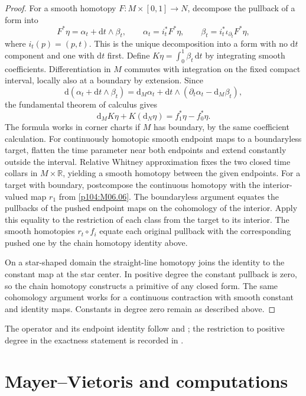 \documentclass[11pt,oneside,openany]{book}
\theoremstyle{definition}
\theoremstyle{remark}
\newcommand{\R}{\mathbb R}
\newcommand{\dd}{\mathrm d}
\begin{document}
\begin{proof}
For a smooth homotopy \(F:M\times[0,1]\to N\), decompose the
pullback of a form into
\[
 F^*\eta=\alpha_t+\dd t\wedge\beta_t,\qquad
 \alpha_t=i_t^*F^*\eta,\qquad
 \beta_t=i_t^*\iota_{\partial_t}F^*\eta ,
\]
where \(i_t(p)=(p,t)\). This is the unique decomposition into
a form with no \(\dd t\) component and one with \(\dd t\) first.
Define \(K\eta=\int_0^1\beta_t\,\dd t\) by integrating smooth
coefficients. Differentiation in \(M\) commutes with integration
on the fixed compact interval, locally also at a boundary by
extension. Since
\[
 \dd(\alpha_t+\dd t\wedge\beta_t)
   =\dd_M\alpha_t+\dd t\wedge(\partial_t\alpha_t-\dd_M\beta_t),
\]
the fundamental theorem of calculus gives
\[
       \dd_M K\eta+K(\dd_N\eta)=f_1^*\eta-f_0^*\eta .
\]
The formula works in corner charts if \(M\) has boundary, by
the same coefficient calculation. For continuously homotopic
smooth endpoint maps to a boundaryless target, flatten the
time parameter near both endpoints and extend constantly
outside the interval. Relative Whitney approximation fixes
the two closed time collars in \(M\times\R\), yielding a
smooth homotopy between the given endpoints. For a target
with boundary, postcompose the continuous homotopy with
the interior-valued map \(r_1\) from \cref{p104:M06.06}.
The boundaryless argument equates the pullbacks of the
pushed endpoint maps on the cohomology of the interior.
Apply this equality to the restriction of each class
from the target to its interior. The smooth homotopies \(r_t\circ f_i\) equate
each original pullback with the corresponding pushed one
by the chain homotopy identity above.

On a star-shaped domain the straight-line homotopy joins the
identity to the constant map at the star center. In positive
degree the constant pullback is zero, so the chain homotopy
constructs a primitive of any closed form. The same cohomology
argument works for a continuous contraction with smooth
constant and identity maps. Constants in degree zero remain
as described above.
\end{proof}
The operator and its endpoint identity follow
\cite[pp.~443--448]{lee} and \cite[\S\S27,29]{tu}; the restriction
to positive degree in the exactness statement is recorded in
\cite[p.~447]{leeerrata}.

\section{Mayer--Vietoris and computations}
\end{document}
